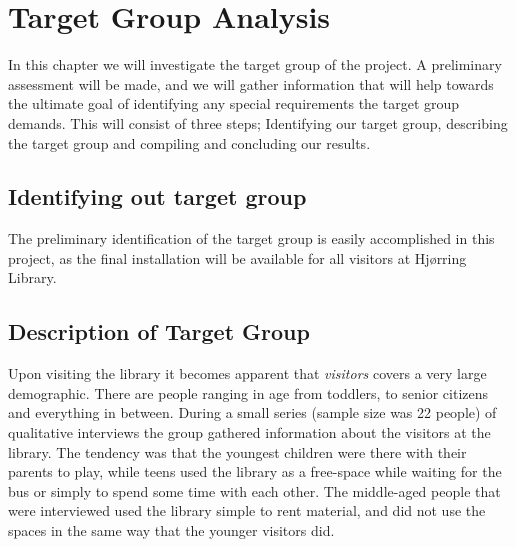 \chapter{Target Group Analysis}

In this chapter we will investigate the target group of the project. A preliminary assessment will be made, and we will gather information that will help towards the ultimate goal of identifying any special requirements the target group demands. This will consist of three steps; Identifying our target group, describing the target group and compiling and concluding our results.

\section{Identifying out target group}
The preliminary identification of the target group is easily accomplished in this project, as the final installation will be available for all visitors at Hj{\o}rring Library. 

\section{Description of Target Group}
Upon visiting the library it becomes apparent that \textit{visitors} covers a very large demographic. There are people ranging in age from toddlers, to senior citizens and everything in between. During a small series (sample size was 22 people) of qualitative interviews the group gathered information about the visitors at the library. The tendency was that the youngest children were there with their parents to play, while teens used the library as a free-space while waiting for the bus or simply to spend some time with each other. The middle-aged people that were interviewed used the library simple to rent material, and did not use the spaces in the same way that the younger visitors did.

